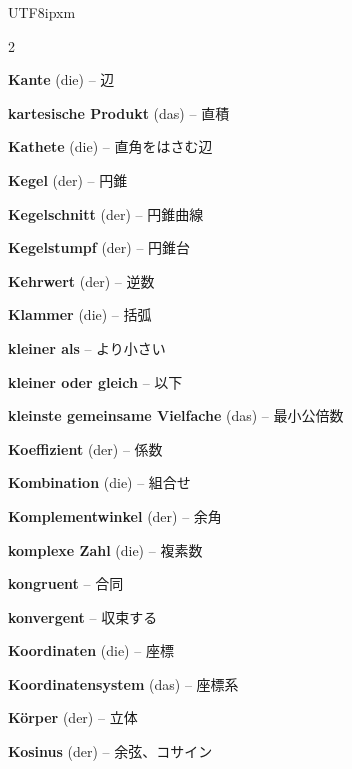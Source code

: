 \begin{CJK}{UTF8}{ipxm}
\begin{multicols}{2}
\par\nopagebreak
\textbf{Kante} (die) -- 辺\dotfill\hyperref[e:246]{\pageref*{e:246}}\par
\textbf{kartesische Produkt} (das) -- 直積\dotfill\hyperref[e:103]{\pageref*{e:103}}\par
\textbf{Kathete} (die) -- 直角をはさむ辺\dotfill\hyperref[e:187]{\pageref*{e:187}}\par
\textbf{Kegel} (der) -- 円錐\dotfill\hyperref[e:231]{\pageref*{e:231}}\par
\textbf{Kegelschnitt} (der) -- 円錐曲線\dotfill\hyperref[e:312]{\pageref*{e:312}}\par
\textbf{Kegelstumpf} (der) -- 円錐台\dotfill\hyperref[e:236]{\pageref*{e:236}}\par
\textbf{Kehrwert} (der) -- 逆数\dotfill\hyperref[e:39]{\pageref*{e:39}}\par
\textbf{Klammer} (die) -- 括弧\dotfill\hyperref[e:87]{\pageref*{e:87}}\par
\textbf{kleiner als} -- より小さい\dotfill\hyperref[e:63]{\pageref*{e:63}}\par
\textbf{kleiner oder gleich} -- 以下\dotfill\hyperref[e:65]{\pageref*{e:65}}\par
\textbf{kleinste gemeinsame Vielfache} (das) -- 最小公倍数\dotfill\hyperref[e:57]{\pageref*{e:57}}\par
\textbf{Koeffizient} (der) -- 係数\dotfill\hyperref[e:74]{\pageref*{e:74}}\par
\textbf{Kombination} (die) -- 組合せ\dotfill\hyperref[e:343]{\pageref*{e:343}}\par
\textbf{Komplementwinkel} (der) -- 余角\dotfill\hyperref[e:164]{\pageref*{e:164}}\par
\textbf{komplexe Zahl} (die) -- 複素数\dotfill\hyperref[e:10]{\pageref*{e:10}}\par
\textbf{kongruent} -- 合同\dotfill\hyperref[e:175]{\pageref*{e:175}}\par
\textbf{konvergent} -- 収束する\dotfill\hyperref[e:262]{\pageref*{e:262}}\par
\textbf{Koordinaten} (die) -- 座標\dotfill\hyperref[e:116]{\pageref*{e:116}}\par
\textbf{Koordinatensystem} (das) -- 座標系\dotfill\hyperref[e:113]{\pageref*{e:113}}\par
\textbf{Körper} (der) -- 立体\dotfill\hyperref[e:225]{\pageref*{e:225}}\par
\textbf{Kosinus} (der) -- 余弦、コサイン\dotfill\hyperref[e:133]{\pageref*{e:133}}\par

\end{multicols}
\end{CJK}
